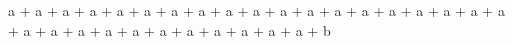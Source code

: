 a + a + a + a + a + a + a + a + a + a + a + a + a + a + a + a + a + a + a + a + a + a + a + a + a + a + a + a + a + a + b
